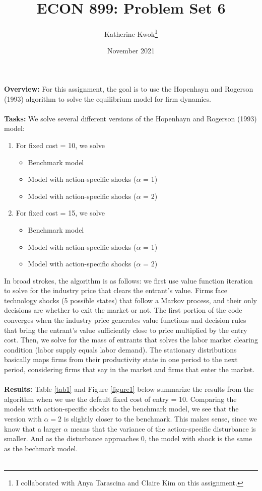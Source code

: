 \documentclass[12pt]{article}
\title{ECON 899: Problem Set 6}
\author{Katherine Kwok\footnote{I collaborated with Anya Tarascina and Claire Kim on this assignment.}}
\date{November 2021}
\begin{document}
\maketitle
\noindent \textbf{Overview:} For this assignment, the goal is to use the Hopenhayn and Rogerson (1993) algorithm to solve the equilibrium model for firm dynamics. \\\\
\noindent \textbf{Tasks:} We solve several different versions of the Hopenhayn and Rogerson (1993) model: 
\begin{enumerate}
	\item For fixed cost = 10, we solve
		\begin{itemize}
			\item Benchmark model
			\item Model with action-specific shocks ($\alpha$ = 1)
			\item Model with action-specific shocks ($\alpha$ = 2)
		\end{itemize}
	\item For fixed cost = 15, we solve
				\begin{itemize}
			\item Benchmark model
			\item Model with action-specific shocks ($\alpha$ = 1)
			\item Model with action-specific shocks ($\alpha$ = 2)
		\end{itemize}
\end{enumerate}
In broad strokes, the algorithm is as follows: we first use value function iteration to solve for the industry price that clears the entrant's value. Firms face technology shocks (5 possible states) that follow a Markov process, and their only decisions are whether to exit the market or not. The first portion of the code converges when the industry price generates value functions and decision rules that bring the entrant's value sufficiently close to price multiplied by the entry cost. Then, we solve for the mass of entrants that solves the labor market clearing condition (labor supply equals labor demand). The stationary distributions basically maps firms from their productivity state in one period to the next period, considering firms that say in the market and firms that enter the market. \\\\
\noindent \textbf{Results:} Table \ref{tab1} and Figure \ref{figure1} below summarize the results from the algorithm when we use the default fixed cost of entry = 10. Comparing the models with action-specific shocks to the benchmark model, we see that the version with $\alpha = 2$ is slightly closer to the benchmark. This makes sense, since we know that a larger $\alpha$ means that the variance of the action-specific disturbance is smaller. And as the disturbance approaches 0, the model with shock is the same as the bechmark model. \\\\
\end{document}
